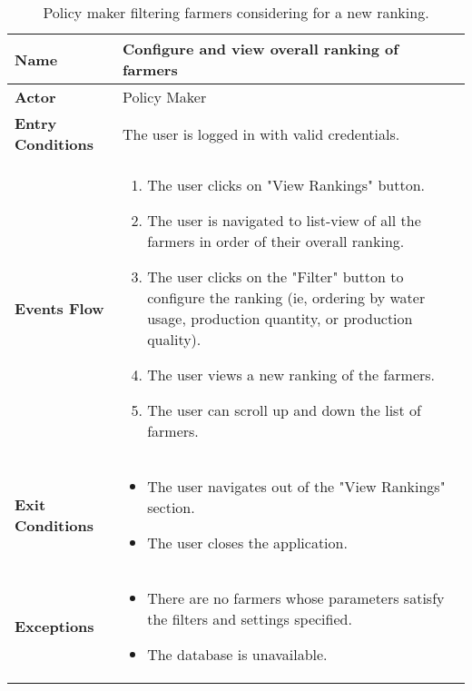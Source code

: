 
\begin{table}[hbt!]
\centering
\small
\caption{\label{tab:addOne{table_counter}}Policy maker filtering farmers considering for a new ranking.}
\renewcommand{\arraystretch}{1.25}
\begin{tabular}{|l|>{\raggedright\arraybackslash}m{12cm}|}

    \hline
    \textbf{Name} & Configure and view overall ranking of farmers\\
    \hline
   	\textbf{Actor} & Policy Maker\\
    \hline
    \textbf{Entry Conditions} & The user is logged in with valid credentials.\\
    \hline
    \textbf{Events Flow} & 
    \begin{enumerate}
   	\item The user clicks on "View Rankings" button.
   	\item The user is navigated to list-view of all the farmers in order of their overall ranking. 
    \item The user clicks on the "Filter" button to configure the ranking (ie, ordering by water usage, production quantity, or production quality). 
    	\item The user views a new ranking of the farmers. 
    	\item The user can scroll up and down the list of farmers.
    \end{enumerate} \\ \hline
    \textbf{Exit Conditions} & 
    \begin{itemize}
    	\item The user navigates out of the "View Rankings" section. 
    	\item The user closes the application.
    \end{itemize}\\
    \hline
    \textbf{Exceptions} & 
    \begin{itemize}
    	\item There are no farmers whose parameters satisfy the filters and settings specified.
    	\item The database is unavailable.
    \end{itemize}\\
    \hline
\end{tabular}
\end{table}